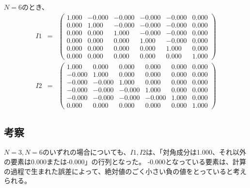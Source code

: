 \documentclass[11pt]{ltjsarticle}
\begin{document}
			$N=6$のとき、
			\begin{eqnarray*}
				I1 & = & \left( \begin{array}{cccccc}
					1.000 & -0.000 & -0.000 & -0.000 & -0.000 & 0.000\\
					0.000 & 1.000 & -0.000 & -0.000 & -0.000 & 0.000\\
					0.000 & 0.000 & 1.000 & -0.000 & -0.000 & 0.000\\
					0.000 & 0.000 & 0.000 & 1.000 & -0.000 & 0.000\\
					0.000 & 0.000 & 0.000 & 0.000 & 1.000 & 0.000\\
					0.000 & 0.000 & 0.000 & 0.000 & 0.000 & 1.000
				\end{array} \right)\\
				I2 & = & \left( \begin{array}{cccccc}
					1.000 & 0.000 & 0.000 & 0.000 & 0.000 & 0.000\\
					-0.000 & 1.000 & 0.000 & 0.000 & 0.000 & 0.000\\
					-0.000 & -0.000 & 1.000 & 0.000 & 0.000 & 0.000\\
					-0.000 & -0.000 & -0.000 & 1.000 & 0.000 & 0.000\\
					-0.000 & -0.000 & -0.000 & -0.000 & 1.000 & 0.000\\
					0.000 & 0.000 & 0.000 & 0.000 & 0.000 & 1.000
				\end{array} \right)
			\end{eqnarray*}
			
		\subsection{考察}
			$N=3,N=6$のいずれの場合についても、$I1,I2$は、「対角成分は1.000、それ以外の要素は0.000または-0.000」の行列となった。
			-0.000となっている要素は、計算の過程で生まれた誤差によって、絶対値のごく小さい負の値をとっていると考えられる。
\end{document}
